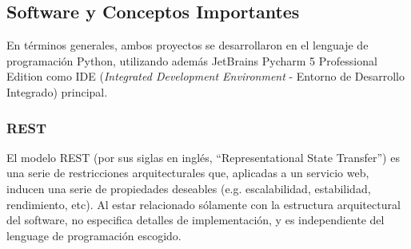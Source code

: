 \documentclass[11pt,letterpaper]{article}
\begin{document}
\subsection{Software y Conceptos Importantes}
En términos generales, ambos proyectos se desarrollaron en el lenguaje de programación Python\cite{python}, utilizando además JetBrains Pycharm 5 Professional Edition\cite{pycharm} como IDE (\emph{Integrated Development Environment} - Entorno de Desarrollo Integrado) principal.

\subsubsection{REST}

El modelo REST (por sus siglas en inglés, ``Representational State Transfer'') es una serie de restricciones arquitecturales que, aplicadas a un servicio web, inducen una serie de propiedades deseables (e.g. escalabilidad, estabilidad, rendimiento, etc). Al estar relacionado sólamente con la estructura arquitectural del software, no especifica detalles de implementación, y es independiente del lenguage de programación escogido.\\
\end{document}

